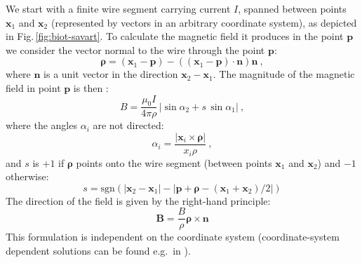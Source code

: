 We start with a finite wire segment carrying current $I$, spanned between points $\bm{x}_1$ and $\bm{x}_2$ (represented by vectors in an arbitrary coordinate system), as depicted in Fig.\,\ref{fig:biot-savart}. To calculate the magnetic field it produces in the point $\bm{p}$ we consider the vector normal to the wire through the point $\bm{p}$:
\begin{equation}
  \bm{\rho} = (\bm{x}_1 - \bm{p}) - \left( \left( \bm{x}_1 - \bm{p} \right) \cdot \bm{n} \right)\bm{n} \ ,
\end{equation}
where $\bm{n}$ is a unit vector in the direction $\bm{x}_2 -\bm{x}_1$. The magnitude of the magnetic field in point $\bm{p}$ is then \cite{Griffith}:
\begin{equation}
  \label{eq:biot_savart}
  B = \frac{\mu_0 I}{4 \pi \rho} \, \left| \sin \alpha_2 + s\, \sin \alpha_1 \right| \ ,
\end{equation}
where the angles $\alpha_i$ are not directed:
\begin{equation}
  \alpha_i = \frac{ \left| \bm{x}_i \times \bm{\rho} \right| }{ x_i \rho } \ ,
\end{equation}
and $s$ is $+1$ if $\bm{\rho}$ points onto the wire segment (between points $\bm{x}_1$ and $\bm{x}_2$) and $-1$ otherwise:
\begin{equation}
  s = \mathrm{sgn}\left( \left| \bm{x}_2 - \bm{x}_1 \right| - \left| \bm{p} + \bm{\rho} - \left( \bm{x}_1 + \bm{x}_2 \right) / 2 \right| \right)
\end{equation}
The direction of the field is given by the right-hand principle:
\begin{equation}
  \mathbf{B} = \frac{B}{\rho} \bm{\rho} \times \bm{n}
\end{equation}
This formulation is independent on the coordinate system (coordinate-system dependent solutions can be found e.g.\ in \cite{Grivich2000}).


